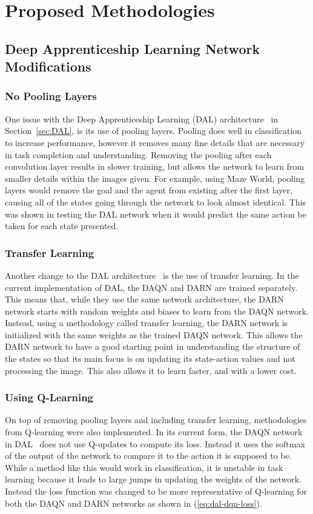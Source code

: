 \documentclass[12pt,american]{report}
\begin{document}
\chapter{Proposed Methodologies}
\label{sec:proposed_architectures}
\section{Deep Apprenticeship Learning Network Modifications}
\subsection{No Pooling Layers}
One issue with the Deep Apprenticeship Learning (DAL) architecture~\cite{markovikj2014deep} in Section~\ref{sec:DAL}, is its use of pooling layers.  Pooling does well in classification to increase performance, however it removes many fine details that are necessary in task completion and understanding.  Removing the pooling after each convolution layer results in slower training, but allows the network to learn from smaller details within the images given.  For example, using Maze World, pooling layers would remove the goal and the agent from existing after the first layer, causing all of the states going through the network to look almost identical.  This was shown in testing the DAL network when it would predict the same action be taken for each state presented.
\subsection{Transfer Learning}
Another change to the DAL architecture~\cite{markovikj2014deep} is the use of transfer learning.  In the current implementation of DAL, the DAQN and DARN are trained separately.  This means that, while they use the same network architecture, the DARN network starts with random weights and biases to learn from the DAQN network.  Instead, using a methodology called transfer learning, the DARN network is initialized with the same weights as the trained DAQN network.  This allows the DARN network to have a good starting point in understanding the structure of the states so that its main focus is on updating its state-action values and not processing the image.  This also allows it to learn faster, and with a lower cost.
\subsection{Using Q-Learning}
On top of removing pooling layers and including transfer learning, methodologies from Q-learning were also implemented.  In its current form, the DAQN network in DAL~\cite{markovikj2014deep} does not use Q-updates to compute its loss.  Instead it uses the softmax of the output of the network to compare it to the action it is supposed to be.  While a method like this would work in classification, it is unstable in task learning because it leads to large jumps in updating the weights of the network.  Instead the loss function was changed to be more representative of Q-learning for both the DAQN and DARN networks as shown in (\ref{eq:dal-dqn-loss}).
\end{document}
